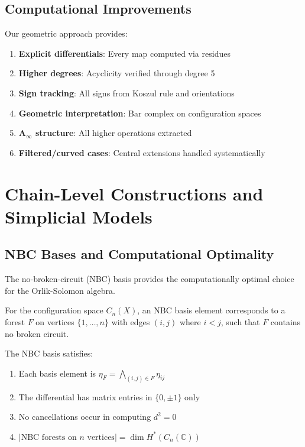 \subsection{Computational Improvements}
 
Our geometric approach provides:
\begin{enumerate}
\item \textbf{Explicit differentials}: Every map computed via residues
\item \textbf{Higher degrees}: Acyclicity verified through degree 5
\item \textbf{Sign tracking}: All signs from Koszul rule and orientations
\item \textbf{Geometric interpretation}: Bar complex on configuration spaces
\item \textbf{A$_\infty$ structure}: All higher operations extracted
\item \textbf{Filtered/curved cases}: Central extensions handled systematically
\end{enumerate}
 
\section{Chain-Level Constructions and Simplicial Models}
 
\subsection{NBC Bases and Computational Optimality}
 
The no-broken-circuit (NBC) basis provides the computationally optimal choice for the Orlik-Solomon algebra.
 
\begin{definition}
For the configuration space $C_n(X)$, an NBC basis element corresponds to a forest $F$ on vertices $\{1,\ldots,n\}$ with edges $(i,j)$ where $i < j$, such that $F$ contains no broken circuit.
\end{definition}
 
\begin{theorem}
The NBC basis satisfies:
\begin{enumerate}
\item Each basis element is $\eta_F = \bigwedge_{(i,j) \in F} \eta_{ij}$
\item The differential has matrix entries in $\{0, \pm 1\}$ only
\item No cancellations occur in computing $d^2 = 0$
\item $|\text{NBC forests on $n$ vertices}| = \dim H^*(C_n(\mathbb{C}))$
\end{enumerate}
\end{theorem}

